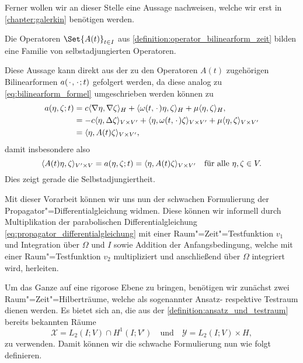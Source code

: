 Ferner wollen wir an dieser Stelle eine Aussage nachweisen, welche wir erst in \cref{chapter:galerkin} benötigen werden.

\begin{Lemma}
\label{lemma:operator_selbstadjungiert}
    Die Operatoren $\Set{A(t)}_{t \in I}$ aus \cref{definition:operator_bilinearform_zeit} bilden eine Familie von selbstadjungierten Operatoren.

    \begin{Beweis}
        Diese Aussage kann direkt aus der zu den Operatoren $A(t)$ zugehörigen Bilinearformen $a(\blank, \blank; t)$ gefolgert werden, da diese analog zu \cref{eq:bilinearform_formel} umgeschrieben werden können zu
        \begin{equation}
        \begin{aligned}
            a(\eta, \zeta; t)
            &= c\skp{\grad \eta}{\grad \zeta}{H} + \skp{\omega(t, \blank) \eta}{\zeta}{H} + \mu \skp{\eta}{\zeta}{H},
            \\&= - c\skp{\eta}{\Delta \zeta}{V \times V'} + \skp{\eta}{\omega(t, \blank) \zeta}{V \times V'} + \mu \skp{\eta}{\zeta}{V \times V'}
            \\&= \skp{\eta}{A(t) \zeta}{V \times V'},
        \end{aligned}
        \end{equation}
        damit insbesondere also
        \begin{equation}
            \skp{A(t)\eta}{\zeta}{V' \times V} = a(\eta, \zeta; t) = \skp{\eta}{A(t) \zeta}{V \times V'} \quad \fa \eta, \zeta \in V.
        \end{equation}
        Dies zeigt gerade die Selbstadjungiertheit.
    \end{Beweis}
\end{Lemma}

Mit dieser Vorarbeit können wir uns nun der schwachen Formulierung der Propagator"=Differentialgleichung widmen.
Diese können wir informell durch Multiplikation der parabolischen Differentialgleichung \cref{eq:propagator_differentialgleichung} mit einer Raum"=Zeit"=Testfunktion $v_{1}$ und Integration über $\Omega$ und $I$ sowie Addition der Anfangsbedingung, welche mit einer Raum"=Testfunktion $v_{2}$ multipliziert und anschließend über $\Omega$ integriert wird, herleiten.

Um das Ganze auf eine rigorose Ebene zu bringen, benötigen wir zunächst zwei Raum"=Zeit"=Hilberträume, welche als sogenannter Ansatz- respektive Testraum dienen werden.
Es bietet sich an, die aus der \cref{definition:ansatz_und_testraum} bereits bekannten Räume
\begin{equation}
    \label{eq:raum_zeit_ansatzraum_testraum}
    \mathcal X = L_{2}(I; V) \cap H^{1}(I; V')
    \quad \text{und} \quad
    \mathcal Y = L_{2}(I; V) \times H,
\end{equation}
zu verwenden.
Damit können wir die schwache Formulierung nun wie folgt definieren.

